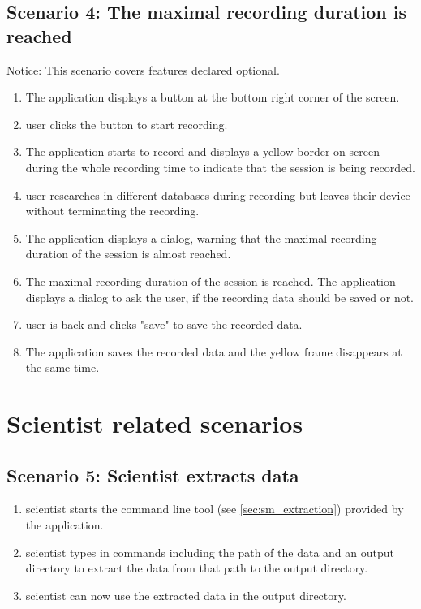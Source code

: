 \subsection{Scenario 4: The maximal recording duration is reached}
Notice: This scenario covers features declared optional.
\begin{enumerate}
    \item The application displays a button at the bottom right corner of the screen.
    \item \Gls{user} clicks the button to start recording.
    \item The application starts to record and displays a yellow border on screen during the whole recording time to indicate that the \gls{session} is being recorded.
    \item \Gls{user} researches in different databases during recording but leaves their \gls{device} without terminating the recording.
    \item The application displays a dialog, warning that the maximal recording duration of the \gls{session} \see[OC10] is almost reached.
    \item The maximal recording duration of the \gls{session} \see[OC10] is reached. The application displays a dialog to ask the \gls{user}, if the recording data should be saved or not.
    \item \Gls{user} is back and clicks "save" to save the recorded data.
    \item The application saves the recorded data and the yellow frame disappears at the same time.
\end{enumerate}

\section{Scientist related scenarios}
\subsection{Scenario 5: Scientist extracts data}
\begin{enumerate}
    \item \Gls{scientist} starts the command line tool (see \ref{sec:sm_extraction}) provided by the application.
    \item \Gls{scientist} types in commands including the path of the data and an output directory to extract the data from that path to the output directory.
    \item \Gls{scientist} can now use the extracted data in the output directory.
\end{enumerate}


